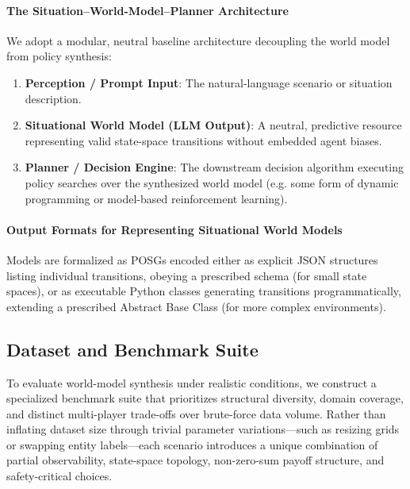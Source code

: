 \documentclass{article}
\begin{document}
\paragraph{The Situation--World-Model--Planner Architecture}
We adopt a modular, neutral baseline architecture decoupling the world model from policy synthesis:
\begin{enumerate}
    \item \textbf{Perception / Prompt Input}: The natural-language scenario or situation description.
    \item \textbf{Situational World Model (LLM Output)}: A neutral, predictive resource representing valid state-space transitions without embedded agent biases.
    \item \textbf{Planner / Decision Engine}: The downstream decision algorithm executing policy searches over the synthesized world model (e.g. some form of dynamic programming or model-based reinforcement learning).
\end{enumerate}

\paragraph{Output Formats for Representing Situational World Models}
Models are formalized as POSGs encoded either as explicit JSON structures listing individual transitions, obeying a prescribed schema (for small state spaces), or as executable Python classes generating transitions programmatically, extending a prescribed Abstract Base Class (for more complex environments).


\subsection{Dataset and Benchmark Suite}
\label{sec:dataset}

To evaluate world-model synthesis under realistic conditions, we construct a specialized benchmark suite that prioritizes structural diversity, domain coverage, and distinct multi-player trade-offs over brute-force data volume. Rather than inflating dataset size through trivial parameter variations—such as resizing grids or swapping entity labels—each scenario introduces a unique combination of partial observability, state-space topology, non-zero-sum payoff structure, and safety-critical choices.
\end{document}
